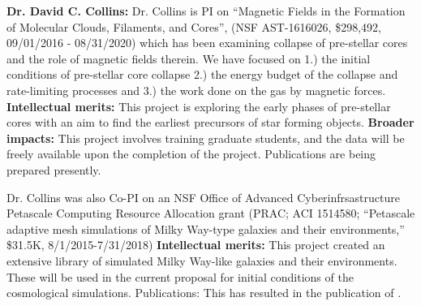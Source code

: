  
\textbf{Dr. David C. Collins:} Dr. Collins is PI on ``Magnetic Fields in the Formation of
Molecular Clouds, Filaments, and Cores'',  (NSF AST-1616026, \$298,492,
09/01/2016 - 08/31/2020)  which has been
examining collapse of pre-stellar cores and the role of magnetic fields therein.
We have focused on 1.) the initial conditions of pre-stellar core collapse 2.)
the energy budget of the collapse and rate-limiting processes and 3.) the work
done on the gas by magnetic forces.
\textbf{Intellectual merits:} This project is exploring the early phases of
pre-stellar cores with an aim to find the earliest precursors of star forming
objects.  \textbf{Broader impacts:} This project involves training graduate
students, and the data will be freely available upon the completion of the
project.  Publications are being prepared presently.

Dr. Collins was also Co-PI on 
an NSF Office of Advanced Cyberinfrsastructure
Petascale Computing Resource Allocation grant (PRAC; ACI 1514580;
``Petascale adaptive mesh simulations of Milky Way-type galaxies and
their environments,'' \$31.5K, 8/1/2015-7/31/2018)  \textbf{Intellectual
merits:} This project created an extensive library of simulated Milky Way-like
galaxies and their environments.  These will be used in the current proposal for
initial conditions of the cosmological simulations.  Publications: This has resulted in the publication of \citet{Chummels19}.
